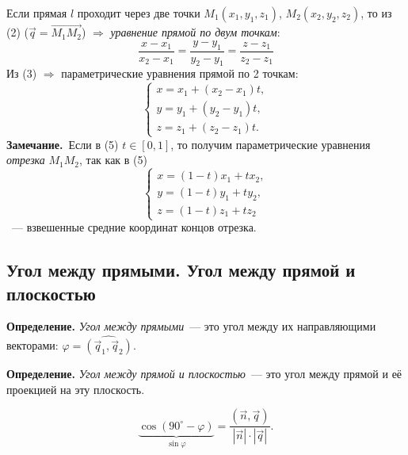 \documentclass[a4paper,11pt]{article}
\newcommand{\zam}{\textbf{Замечание.}\ }
\begin{document}
Если прямая $l$ проходит через две точки $M_1(x_1,y_1,z_1)$, $M_2(x_2,y_2,z_2)$, то из (2)
($\vec q=\overrightarrow{M_1M_2}$) $\Rightarrow$ \emph{уравнение прямой по двум точкам}:
\[
\boxed{\ \frac{x-x_1}{x_2-x_1}=\frac{y-y_1}{y_2-y_1}=\frac{z-z_1}{z_2-z_1}\ }\tag{4}
\]
Из (3) $\Rightarrow$ параметрические уравнения прямой по 2 точкам:
\[
\begin{cases}x=x_1+(x_2-x_1)t,\\y=y_1+(y_2-y_1)t,\\z=z_1+(z_2-z_1)t.\end{cases}\tag{5}
\]
\zam Если в (5) $t\in[0,1]$, то получим параметрические уравнения \emph{отрезка} $M_1M_2$, так как в (5)
\[
\begin{cases}x=(1-t)x_1+tx_2,\\y=(1-t)y_1+ty_2,\\z=(1-t)z_1+tz_2\end{cases}
\]
~--- взвешенные средние координат концов отрезка.

\subsection{Угол между прямыми. Угол между прямой и плоскостью}
\begin{opr}
\textbf{Определение.} \emph{Угол между прямыми}~--- это угол между их направляющими векторами:
$\varphi=\widehat{(\vec q_1,\vec q_2)}$.
\end{opr}
\begin{center}
\end{center}

\begin{opr}
\textbf{Определение.} \emph{Угол между прямой и плоскостью}~--- это угол между прямой и её проекцией
на эту плоскость.
\end{opr}
\begin{center}
\end{center}
\[
\underbrace{\cos(90^\circ-\varphi)}_{\sin\varphi}=\frac{(\vec n,\vec q)}{|\vec n|\cdot|\vec q|}.
\]
\end{document}
